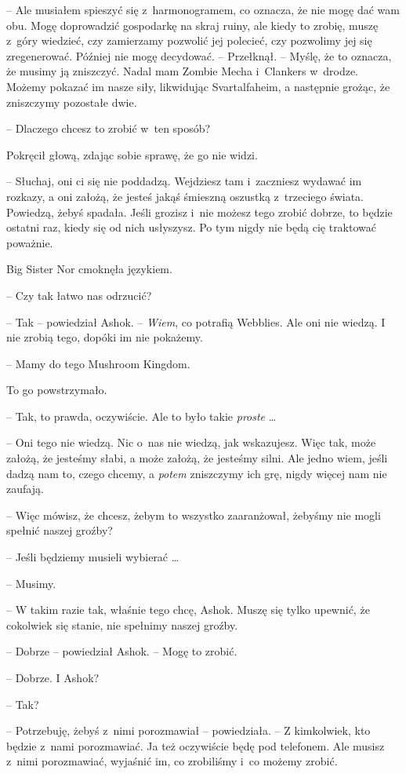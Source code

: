 \documentclass[oneside,polish,11pt,rmheadings]{mwbk}
\begin{document}
-- Ale musiałem spieszyć się z~harmonogramem, co oznacza, że nie mogę dać wam obu. Mogę doprowadzić gospodarkę na skraj ruiny, ale kiedy to zrobię, muszę z~góry wiedzieć, czy zamierzamy pozwolić jej polecieć, czy pozwolimy jej się zregenerować. Później nie mogę decydować. -- Przełknął. -- Myślę, że to oznacza, że musimy ją zniszczyć. Nadal mam Zombie Mecha i~Clankers w~drodze. Możemy pokazać im nasze siły, likwidując Svartalfaheim, a następnie grożąc, że zniszczymy pozostałe dwie.

-- Dlaczego chcesz to zrobić w~ten sposób? 

Pokręcił głową, zdając sobie sprawę, że go nie widzi. 

-- Słuchaj, oni ci się nie poddadzą. Wejdziesz tam i~zaczniesz wydawać im rozkazy, a oni założą, że jesteś jakąś śmieszną oszustką z~trzeciego świata. Powiedzą, żebyś spadała. Jeśli grozisz i~nie możesz tego zrobić dobrze, to będzie ostatni raz, kiedy się od nich usłyszysz. Po tym nigdy nie będą cię traktować poważnie.

Big Sister Nor cmoknęła językiem. 

-- Czy tak łatwo nas odrzucić? 

-- Tak -- powiedział Ashok. -- \textit{Wiem}, co potrafią Webblies. Ale oni nie wiedzą. I nie zrobią tego, dopóki im nie pokażemy.

-- Mamy do tego Mushroom Kingdom.

To go powstrzymało. 

-- Tak, to prawda, oczywiście. Ale to było takie \textit{proste} \ldots 

-- Oni tego nie wiedzą. Nic o~nas nie wiedzą, jak wskazujesz. Więc tak, może założą, że jesteśmy słabi, a może założą, że jesteśmy silni. Ale jedno wiem, jeśli dadzą nam to, czego chcemy, a \textit{potem }zniszczymy ich grę, nigdy więcej nam nie zaufają.

-- Więc mówisz, że chcesz, żebym to wszystko zaaranżował, żebyśmy nie mogli spełnić naszej groźby?

-- Jeśli będziemy musieli wybierać \ldots 

-- Musimy.

-- W takim razie tak, właśnie tego chcę, Ashok. Muszę się tylko upewnić, że cokolwiek się stanie, nie spełnimy naszej groźby.

-- Dobrze -- powiedział Ashok. -- Mogę to zrobić. 

-- Dobrze. I Ashok?

-- Tak?

-- Potrzebuję, żebyś z~nimi porozmawiał -- powiedziała. -- Z kimkolwiek, kto będzie z~nami porozmawiać. Ja też oczywiście będę pod telefonem. Ale musisz z~nimi porozmawiać, wyjaśnić im, co zrobiliśmy i~co możemy zrobić.
\end{document}

